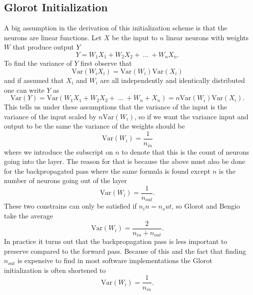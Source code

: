 \subsection{Glorot Initialization}
A big assumption in the derivation of this initialization scheme is that the neurons are linear functions.
Let $X$ be the input to $n$ linear neurons with weights $W$ that produce output $Y$
\begin{equation*}
Y = W_1X_1 + W_2X_2 + ~...~ + W_nX_n.
\end{equation*}
To find the variance of $Y$ first observe that
\begin{equation*}
\mbox{Var}(W_iX_i) = \mbox{Var}(W_i)\mbox{Var}(X_i)
\end{equation*}
and if assumed that $X_i$ and $W_i$ are all independently and identically distributed one can write $Y$ as
\begin{equation*}
\mbox{Var}(Y) = \mbox{Var}(W_1X_1 + W_2X_2 + ~...~ + W_n+X_n) = n\mbox{Var}(W_i)\mbox{Var}(X_i).
\end{equation*}
This tells us under these assumptions that the variance of the input is the variance of the input scaled by $n\mbox{Var}(W_i)$, so if we want the variance input and output to be the same the variance of the weights should be
\begin{equation*}
\mbox{Var}(W_i) = \frac{1}{n_{in}}
\end{equation*}
where we introduce the subscript on $n$ to denote that this is the count of neurons going into the layer.
The reason for that is because the above must also be done for the backpropagated pass where the same formula is found except $n$ is the number of neurons going out of the layer
\begin{equation*}
\mbox{Var}(W_i) = \frac{1}{n_{out}}.
\end{equation*}
These two constrains can only be satisfied if $n_in = n_out$, so Glorot and Bengio take the average
\begin{equation}
\mbox{Var}(W_i) = \frac{2}{n_{in} + n_{out}}.
\label{eq:glorotinit}
\end{equation}
In practice it turns out that the backpropagation pass is less important to preserve compared to the forward pass.
Because of this and the fact that finding $n_{out}$ is expensive to find in most software implementations the Glorot initialization is often shortened to
\begin{equation}
\mbox{Var}(W_i) = \frac{1}{n_{in}}.
\label{eq:glorotshort}
\end{equation}


